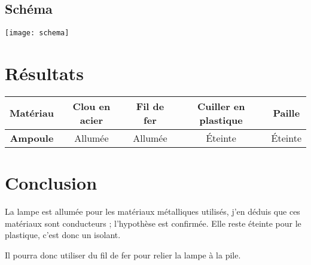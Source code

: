 \documentclass[11pt,a4paper]{article}
\begin{document}
	\subsection{Schéma}
	
		\begin{center}
			\texttt{[image: schema]}
		\end{center}
	
\section{Résultats}
	\begin{tabular}{|@{\ }c@{\ }|@{\ }c@{\ }|@{\ }c@{\ }|@{\ }c@{\ }|@{\ }c@{\ }|}
		\hline
		\textbf{Matériau} & Clou en acier & Fil de fer & Cuiller en plastique & Paille  \\ \hline
		\textbf{Ampoule}  & Allumée        & Allumée     & \'Eteinte              & \'Eteinte \\ \hline
	\end{tabular}

\section{Conclusion}

	La lampe est allumée pour les matériaux métalliques utilisés, j'en déduis que ces matériaux sont conducteurs ; l'hypothèse est confirmée. Elle reste éteinte pour le plastique, c'est donc un isolant. 
	
	Il pourra donc utiliser du fil de fer pour relier la lampe à la pile.

	
\end{document}

